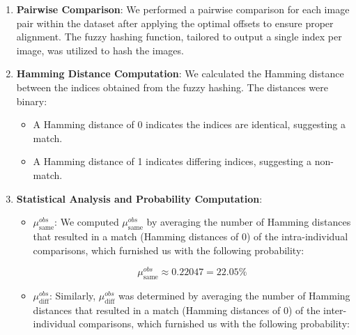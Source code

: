 \begin{enumerate}
    \item \textbf{Pairwise Comparison}: We performed a pairwise comparison for each image pair within the dataset after applying the optimal offsets to ensure proper alignment. The fuzzy hashing function, tailored to output a single index per image, was utilized to hash the images.

    \item \textbf{Hamming Distance Computation}: We calculated the Hamming distance between the indices obtained from the fuzzy hashing. The distances were binary:
    \begin{itemize}
        \item A Hamming distance of 0 indicates the indices are identical, suggesting a match.
        \item A Hamming distance of 1 indicates differing indices, suggesting a non-match.
    \end{itemize} 
    
    \item \textbf{Statistical Analysis and Probability Computation}:
    \begin{itemize}
        \item \textbf{\(\mu_{\text{same}}^{obs}\)}: We computed \(\mu_{\text{same}}^{obs}\) by averaging the number of Hamming distances that resulted in a match (Hamming distances of 0) of the intra-individual comparisons, which furnished us with the following probability:

        \[ \mu_{\text{same}}^{obs} \approx 0.22047 = 22.05\%\]
        
        \item \textbf{\(\mu_{\text{diff}}^{obs}\)}: Similarly, \(\mu_{\text{diff}}^{obs}\) was determined by averaging the number of Hamming distances that resulted in a match (Hamming distances of 0) of the inter-individual comparisons, which furnished us with the following probability:


\end{itemize}
\end{enumerate}
